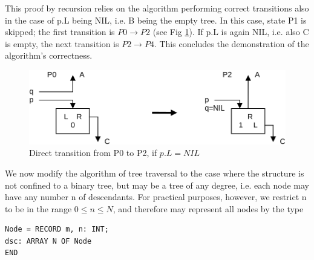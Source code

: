 This proof by recursion relies on the algorithm performing correct transitions also in the case of p.L
being NIL, i.e. B being the empty tree. In this case, state P1 is skipped; the first transition is $P0 \rightarrow P2$ (see Fig \ref{fig:transition-direct}).
If p.L is again NIL, i.e. also C is empty, the next transition is $P2 \rightarrow P4$. This concludes the
demonstration of the algorithm's correctness.
\begin{figure}
	\label{fig:transition-direct}
	\centering
	\includegraphics[width=\textwidth]{i/w}
	\caption{Direct transition from P0 to P2, if $p.L = NIL$}
\end{figure}

We now modify the algorithm of tree traversal to the case where the structure is not confined to a
binary tree, but may be a tree of any degree, i.e. each node may have any number n of
descendants. For practical purposes, however, we restrict n to be in the range $0 \leq n \leq N$, and
therefore may represent all nodes by the type
\begin{verbatim}
Node = RECORD m, n: INT;
dsc: ARRAY N OF Node
END
\end{verbatim}

